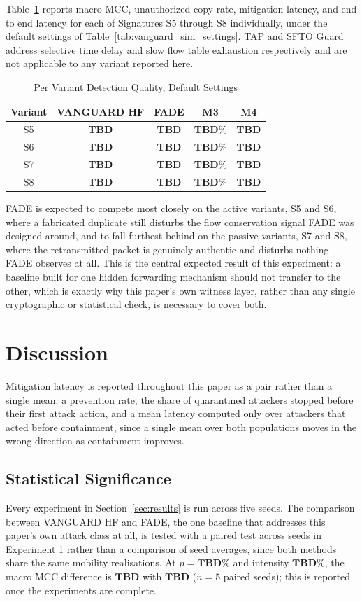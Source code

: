 \documentclass[final,5p,twocolumn]{elsarticle}
\theoremstyle{remark}
\theoremstyle{plain}
\newcommand{\TBD}{\textbf{TBD}} %
\begin{document}
Table~\ref{tab:exp5_variant} reports macro MCC, unauthorized copy rate,
mitigation latency, and end to end latency for each of Signatures S5
through S8 individually, under the default settings of
Table~\ref{tab:vanguard_sim_settings}. TAP and SFTO Guard address selective
time delay and slow flow table exhaustion respectively and are not
applicable to any variant reported here.
\begin{table}[!t]
	\centering
	\caption{Per Variant Detection Quality, Default Settings}
	\label{tab:exp5_variant}
	\renewcommand{\arraystretch}{1.15}
	\footnotesize
	\begin{tabular}{|c|c|c|c|c|}
		\hline
		\textbf{Variant} & \textbf{VANGUARD HF} & \textbf{FADE} & \textbf{M3} & \textbf{M4} \\
		\hline
		S5 & \TBD & \TBD & \TBD\% & \TBD \\
		\hline
		S6 & \TBD & \TBD & \TBD\% & \TBD \\
		\hline
		S7 & \TBD & \TBD & \TBD\% & \TBD \\
		\hline
		S8 & \TBD & \TBD & \TBD\% & \TBD \\
		\hline
	\end{tabular}
\end{table}
FADE is expected to compete most closely on the active variants, S5 and S6,
where a fabricated duplicate still disturbs the flow conservation signal
FADE was designed around, and to fall furthest behind on the passive
variants, S7 and S8, where the retransmitted packet is genuinely authentic
and disturbs nothing FADE observes at all. This is the central expected
result of this experiment: a baseline built for one hidden forwarding
mechanism should not transfer to the other, which is exactly why this
paper's own witness layer, rather than any single cryptographic or
statistical check, is necessary to cover both.


\section{Discussion}
\label{sec:discussion}

Mitigation latency is reported throughout this paper as a pair rather than
a single mean: a prevention rate, the share of quarantined attackers
stopped before their first attack action, and a mean latency computed only
over attackers that acted before containment, since a single mean over both
populations moves in the wrong direction as containment improves.

\subsection{Statistical Significance}
Every experiment in Section~\ref{sec:results} is run across five seeds. The
comparison between VANGUARD HF and FADE, the one baseline that addresses
this paper's own attack class at all, is tested with a paired test across
seeds in Experiment 1 rather than a comparison of seed averages, since both
methods share the same mobility realisations. At $p{=}\TBD\%$ and intensity
$\TBD\%$, the macro MCC difference is $\TBD$ with $\TBD$ ($n{=}5$ paired
seeds); this is reported once the experiments are complete.
\end{document}
